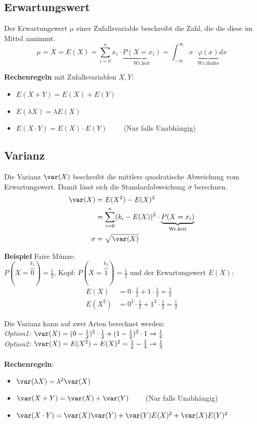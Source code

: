 \subsection{Erwartungswert}
Der Erwartungswert $\mu$ einer Zufallsvariable beschreibt die Zahl, die die diese im Mittel annimmt.
\[
\mu = \overline{X} = E(X)= \sum\limits_{i=0}^{n}x_i\cdot \underbrace{P(X=x_i)}_\text{Wr.keit} = \int_{-\infty}^{\infty}x\cdot \underbrace{\varphi(x)}_{\text{Wr.dichte}}dx
\]

\textbf{Rechenregeln} mit Zufallsvariablen $X, Y$:
\begin{itemize}[nosep]
	\item $E(X + Y) = E(X) + E(Y)$
	\item $E(\lambda X) = \lambda E(X)$ 
	\item $E(X\cdot Y) = E(X) \cdot E(Y) \qquad$  (Nur falls Unabhängig)
\end{itemize}

\subsection{Varianz}
Die Varianz $\var(X)$ beschreibt die mittlere quadratische Abweichung vom Erwartungswert. Damit lässt sich die Standardabweichung $\sigma$ berechnen.
\begin{align*}
	\var(X) &= E(X^2) - E(X)^2 \\
	&=\sum\limits_{i=0}^{n}(k_i - E(X))^2 \cdot \underbrace{P(X=x_i)}_\text{Wr.keit} \\
	\sigma &= \sqrt{\var(X)}	
\end{align*}

\noindent\textbf{Beispiel} Faire Münze:\\
$P(X = \overbrace{0}^{k_1}) = \frac{1}{2}$, Kopf: $P(X = \overbrace{1}^{k_2}) = \frac{1}{2}$ und der Erwartungswert $E(X)$: 
\begin{align*}
	E(X) &= 0\cdot \frac{1}{2} + 1\cdot\frac{1}{2} = \frac{1}{2} \\
	E(X^2) &= 0^2\cdot \frac{1}{2} + 1^2\cdot\frac{1}{2} = \frac{1}{2}
\end{align*}

\noindent Die Varianz kann auf zwei Arten berechnet werden:\\
\textit{Option1:} $\var(X) = (0 - \frac{1}{2})^2 \cdot \frac{1}{2} + (1 - \frac{1}{2})^2 \cdot 1 \xrightarrow{} \frac{1}{4}$\\
\textit{Option2:} $\var(X) = E(X^2) - E(X)^2 = \frac{1}{2} - \frac{1}{4} \rightarrow \frac{1}{4}$
\\ ~\\
\noindent\textbf{Rechenregeln}:
\begin{itemize}[nosep]
	\item $\var(\lambda X) = \lambda^2\var(X)$
	\item $\var(X + Y) = \var(X) + \var(Y) \qquad$ (Nur falls Unabhängig)
	\item $\var(X\cdot Y) = \var(X)\var(Y) + \var(Y)E(X)^2 + \var(X)E(Y)^2$
\end{itemize}

